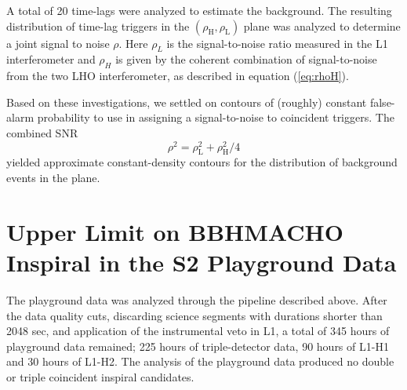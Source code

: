 A total of 20 time-lags were analyzed to estimate the background.  The
resulting distribution of time-lag triggers in the
$(\rho_{\mathrm{H}},\rho_{\mathrm{L}})$ plane was analyzed to determine a
joint signal to noise $\rho$.  Here $\rho_L$ is the signal-to-noise ratio
measured in the L1 interferometer and $\rho_H$ is given by the coherent
combination of signal-to-noise from the two LHO interferometer, as described
in equation (\ref{eq:rhoH}). 

Based on these investigations, we settled on contours of (roughly) constant
false-alarm probability to use in assigning a signal-to-noise to coincident
triggers. The combined SNR
\begin{equation}
\rho^2 = \rho^2_{\mathrm{L}} +  \rho_{\mathrm{H}}^2 / 4
\label{e:combined-snr}
\end{equation}
yielded approximate constant-density contours for the distribution of
background events in the plane.

\section{Upper Limit on BBHMACHO Inspiral in the S2 Playground Data}
\label{s:s2upperlimit}

The playground data was analyzed through the pipeline described above.  After
the data quality cuts,  discarding science segments with durations shorter
than 2048 sec,  and application of the instrumental veto in L1,  a total of
{345} hours of playground data remained; {225} hours of
triple-detector data,  {90} hours of L1-H1 and {30} hours of
L1-H2. The analysis of the playground data produced no double or triple
coincident inspiral candidates.

